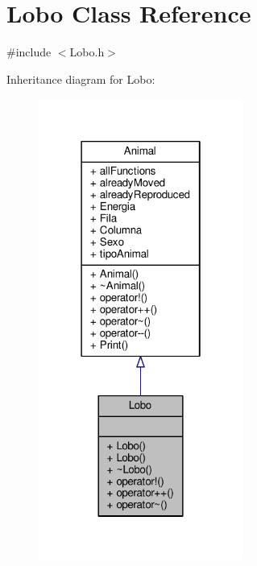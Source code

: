 \hypertarget{classLobo}{}\section{Lobo Class Reference}
\label{classLobo}


{\ttfamily \#include $<$Lobo.\+h$>$}



Inheritance diagram for Lobo\+:\nopagebreak
\begin{figure}[H]
\begin{center}
\leavevmode
\includegraphics[width=190pt]{classLobo__inherit__graph}
\end{center}
\end{figure}


